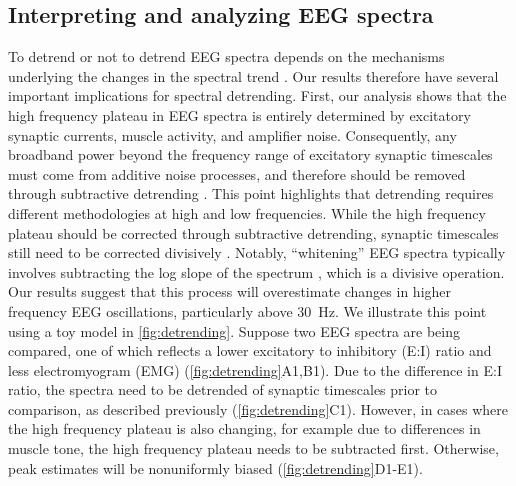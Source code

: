 \subsection{Interpreting and analyzing EEG spectra}
To detrend or not to detrend EEG spectra depends on the mechanisms underlying the changes in the spectral trend \cite{Brake2024}. Our results therefore have several important implications for spectral detrending. First, our analysis shows that the high frequency plateau in EEG spectra is entirely determined by excitatory synaptic currents, muscle activity, and amplifier noise. Consequently, any broadband power beyond the frequency range of excitatory synaptic timescales must come from additive noise processes, and therefore should be removed through subtractive detrending \cite{Miller2009}. This point highlights that detrending requires different methodologies at high and low frequencies. While the high frequency plateau should be corrected through subtractive detrending, synaptic timescales still need to be corrected divisively \cite{Brake2024}. Notably, ``whitening'' EEG spectra typically involves subtracting the log slope of the spectrum \cite{Donoghue2020, Buzsaki2004}, which is a divisive operation. Our results suggest that this process will overestimate changes in higher frequency EEG oscillations, particularly above \qty{30}{\hertz}. We illustrate this point using a toy model in {\autoref{fig:detrending}}. Suppose two EEG spectra are being compared, one of which reflects a lower excitatory to inhibitory (E:I) ratio and less electromyogram (EMG) ({\autoref{fig:detrending}A1,B1}). Due to the difference in E:I ratio, the spectra need to be detrended of synaptic timescales prior to comparison, as described previously \cite{Brake2024,Gao2017} ({\autoref{fig:detrending}C1}). However, in cases where the high frequency plateau is also changing, for example due to differences in muscle tone, the high frequency plateau needs to be subtracted first. Otherwise, peak estimates will be nonuniformly biased ({\autoref{fig:detrending}D1-E1}).

